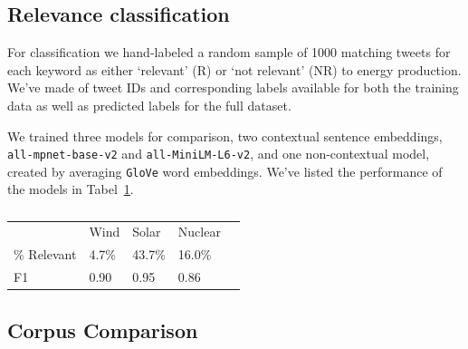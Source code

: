 \subsection{Relevance classification}
For classification we hand-labeled a random sample of 1000 matching tweets
for each keyword
as either `relevant' (R)  or `not relevant' (NR) to energy production. 
We've made of tweet IDs and corresponding labels available for both the training data 
as well as predicted labels for the full dataset.

We trained three models for comparison,
two contextual sentence embeddings, \texttt{all-mpnet-base-v2} and \texttt{all-MiniLM-L6-v2},
and one non-contextual model, created by averaging \texttt{GloVe} word embeddings. 
We've listed the performance of the models in Tabel~\ref{tab:F1-scores}.


\begin{table}[t]
\begin{tabular}{lllll}
\toprule
   & Wind & Solar & Nuclear \\
     \cmidrule(lr){2-4} 

   \% Relevant & 4.7\% & 43.7\% & 16.0\% \\
F1 & 0.90 & 0.95  & 0.86   \\

  \bottomrule

\end{tabular}
\caption{}
\label{tab:F1-scores}
\end{table}



\subsection{Corpus Comparison}









